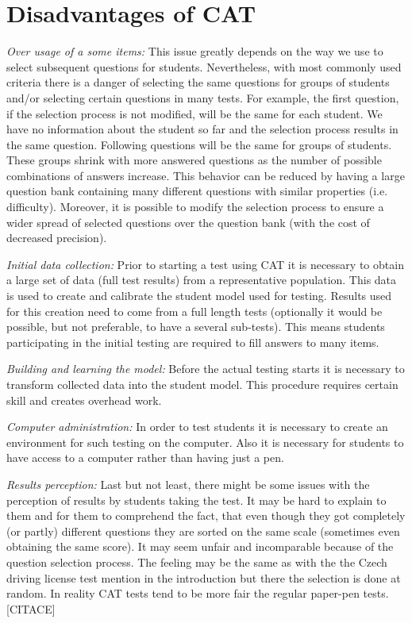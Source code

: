 \section{Disadvantages of CAT}
\emph{Over usage of a some items: }This issue greatly depends on the way we use to select subsequent questions for students. Nevertheless, with most commonly used criteria there is a danger of selecting the same questions for groups of students and/or selecting certain questions in many tests. For example, the first question, if the selection process is not modified, will be the same for each student. We have no information about the student so far and the selection process results in the same question. Following questions will be the same for groups of students. These groups shrink with more answered questions as the number of possible combinations of answers increase. This behavior can be reduced by having a large question bank containing many different questions with similar properties (i.e. difficulty). Moreover, it is possible to modify the selection process to ensure a wider spread of selected questions over the question bank (with the cost of decreased precision).

\emph{Initial data collection:} Prior to starting a test using CAT it is necessary to obtain a large set of data (full test results) from a representative population. This data is used to create and calibrate the student model used for testing. Results used for this creation need to come from a full length tests (optionally it would be possible, but not preferable, to have a several sub-tests). This means students participating in the initial testing are required to fill answers to many items.

\emph{Building and learning the model: }Before the actual testing starts it is necessary to transform collected data into the student model. This procedure requires certain skill and creates overhead work. 

\emph{Computer administration:} In order to test students it is necessary to create an environment for such testing on the computer. Also it is necessary for students to have access to a computer rather than having just a pen.

\emph{Results perception:} Last but not least, there might be some issues with the perception of results by students taking the test. It may be hard to explain to them and for them to comprehend the fact, that even though they got completely (or partly) different questions they are sorted on the same scale (sometimes even obtaining the same score). It may seem unfair and incomparable because of the question selection process. The feeling may be the same as with the the Czech driving license test mention in the introduction but there the selection is done at random. In reality CAT tests tend to be more fair the regular paper-pen tests. [CITACE]
